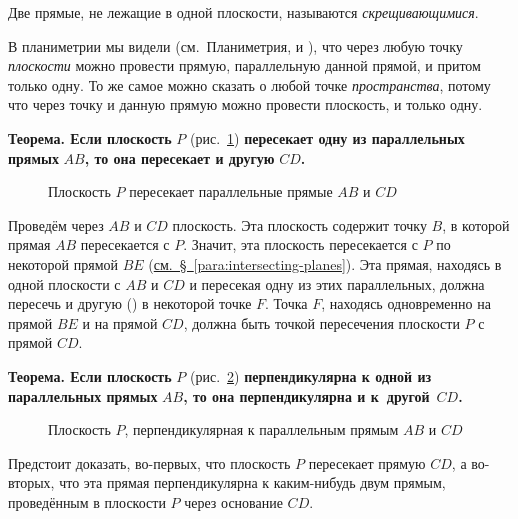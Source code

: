 Две прямые, не лежащие в одной плоскости, называются \emph{скрещивающимися}.

В планиметрии мы видели (см.~Планиметрия,  и ), что через любую точку \emph{плоскости} можно провести прямую, параллельную данной прямой, и притом только одну. То же самое можно сказать о любой точке \emph{пространства}, потому что через точку и данную прямую можно провести плоскость, и только одну.

 \textbf{Теорема. Если плоскость} \(P\) (рис.~\ref{fig:kiselev-stereo-315}) \textbf{пересекает одну из параллельных прямых} \(AB\)\textbf{, то она пересекает и другую} \(CD\)\textbf{.}

\begin{figure}[htbp]
    \centering
    \renewcommand{\thefigure}{315}
    \captionsetup{name=Рис.,labelsep=period}
    
    \caption{Плоскость \(P\) пересекает параллельные прямые \(AB\) и \(CD\)}\label{fig:kiselev-stereo-315}
\end{figure}

Проведём через \(AB\) и \(CD\) плоскость. Эта плоскость содержит точку \(B\), в которой прямая \(AB\) пересекается с \(P\). Значит, эта плоскость пересекается с \(P\) по некоторой прямой \(BE\) (\hyperref[para:intersecting-planes]{см.~§~\ref*{para:intersecting-planes}}). Эта прямая, находясь в одной плоскости с \(AB\) и \(CD\) и пересекая одну из этих параллельных, должна пересечь и другую () в некоторой точке \(F\). Точка \(F\), находясь одновременно на прямой \(BE\) и на прямой \(CD\), должна быть точкой пересечения плоскости \(P\) с прямой \(CD\).

 \textbf{Теорема. Если плоскость} \(P\) (рис.~\ref{fig:kiselev-stereo-316}) \textbf{перпендикулярна к одной из параллельных прямых} \(AB\)\textbf{, то она перпендикулярна и к~другой}~\(CD\)\textbf{.}

\begin{figure}[htbp]
    \centering
    \renewcommand{\thefigure}{316}
    \captionsetup{name=Рис.,labelsep=period}
    
    \caption{Плоскость \(P\), перпендикулярная к параллельным прямым \(AB\) и \(CD\)}\label{fig:kiselev-stereo-316}
\end{figure}

Предстоит доказать, во-первых, что плоскость \(P\) пересекает прямую \(CD\), а во-вторых, что эта прямая перпендикулярна к каким-нибудь двум прямым, проведённым в плоскости \(P\) через основание \(CD\).

